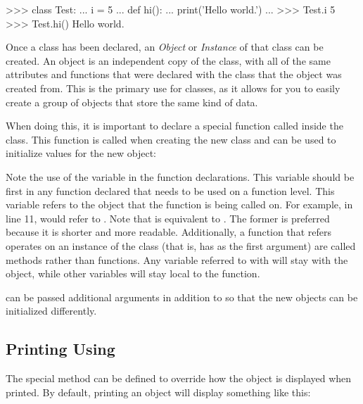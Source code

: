 \documentclass[11pt]{cselabheader}
\begin{document}
\begin{pyconcode}
>>> class Test:
...     i = 5
...     def hi():
...         print('Hello world.')
...
>>> Test.i
5
>>> Test.hi()
Hello world.
\end{pyconcode}

Once a class has been declared, an \emph{Object} or
\emph{Instance} of that class can be created. An object is an independent
copy of the class, with all of the same attributes and functions that were
declared with the class that the object was created from. This is the
primary use for classes, as it allows for you to easily create a group of
objects that store the same kind of data.

When doing this, it is important to declare a special function called
 inside the class. This function is called when
creating the new class and can be used to initialize values for the
new object:


Note the use of the variable  in the function declarations.
This variable should be first in any function declared that needs to be used on
a function level. This variable refers to the object that the function is
being called on. For example, in line 11,  would refer to
. Note that  is equivalent to
. The former is preferred because it is shorter
and more readable. Additionally, a function that refers operates on an instance
of the class (that is, has  as the first argument) are called
methods rather than functions. Any variable referred to with
 will stay with the object, while other
variables will stay local to the function.

 can be passed additional arguments in addition to
 so that the new objects can be initialized differently.

\subsection{Printing Using \protect{}}
The special method  can be defined to override
how the object is displayed when printed. By default, printing an object will
display something like this:
\end{document}
